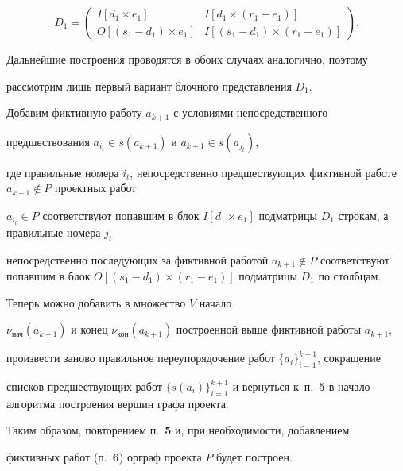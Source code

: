 \[

D_1= \begin{pmatrix}

I[d_1\times e_1] & I[d_1\times (r_1-e_1)]  \\

O[(s_1-d_1)\times e_1] & I[(s_1-d_1)\times (r_1-e_1)]

\end{pmatrix}.

\]







Дальнейшие построения проводятся в обоих случаях аналогично, поэтому

рассмотрим лишь первый вариант блочного  представления $D_1$.

Добавим  фиктивную работу $a_{k+1}$ с условиями непосредственного

предшествования $a_{i_t}\in s(a_{k+1})$ и $a_{k+1}\in s(a_{j_t})$, 

где правильные номера $i_t$, непосредственно предшествующих фиктивной работе $a_{k+1}\notin P$ проектных работ

$a_{i_t}\in P$ соответствуют попавшим в блок $I[d_1\times e_1]$ подматрицы $D_1$ строкам, а правильные номера $j_t$

непосредственно последующих за фиктивной работой $a_{k+1}\notin P$ соответствуют попавшим в блок $O[(s_1-d_1)\times (r_1-e_1)]$ подматрицы $D_1$ по столбцам.





 Теперь можно добавить в множество $V$ начало

$\nu_{\text{нач}}(a_{k+1})$ и конец $\nu_{\text{кон}}

(a_{k+1})$ построенной выше фиктивной работы $a_{k+1}$, 

произвести заново правильное переупорядочение работ $\{a_i\}^{k+1}_{i=1}$, сокращение

списков предшествующих работ $\{s(a_i)\}^{k+1}_{i=1}$ и вернуться к~п.~{\bf 5} в начало алгоритма построения вершин графа проекта.



Таким образом, повторением п.~{\bf 5} и, при необходимости, добавлением

фиктивных работ (п.~{\bf 6}) орграф проекта $P$ будет построен.





